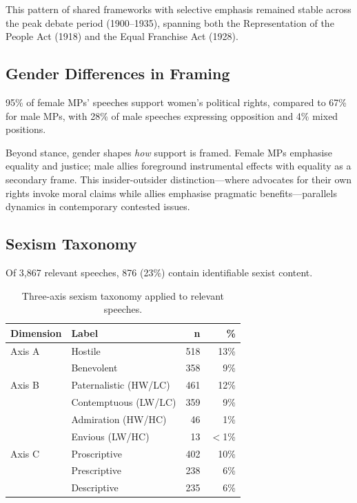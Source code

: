 \documentclass[11pt]{article}
\begin{document}

This pattern of shared frameworks with selective emphasis remained stable across the peak debate period (1900--1935), spanning both the Representation of the People Act (1918) and the Equal Franchise Act (1928).

\subsection{Gender Differences in Framing}

95\% of female MPs' speeches support women's political rights, compared to 67\% for male MPs, with 28\% of male speeches expressing opposition and 4\% mixed positions.

Beyond stance, gender shapes \emph{how} support is framed.
Female MPs emphasise equality and justice; male allies foreground instrumental effects with equality as a secondary frame.
This insider-outsider distinction---where advocates for their own rights invoke moral claims while allies emphasise pragmatic benefits---parallels dynamics in contemporary contested issues.

\subsection{Sexism Taxonomy}

Of 3,867 relevant speeches, 876 (23\%) contain identifiable sexist content.

\begin{table}[h]
\centering
\small
\begin{tabular}{llrr}
\toprule
\textbf{Dimension} & \textbf{Label} & \textbf{n} & \textbf{\%} \\
\midrule
Axis A & Hostile & 518 & 13\% \\
       & Benevolent & 358 & 9\% \\
\midrule
Axis B & Paternalistic (HW/LC) & 461 & 12\% \\
       & Contemptuous (LW/LC) & 359 & 9\% \\
       & Admiration (HW/HC) & 46 & 1\% \\
       & Envious (LW/HC) & 13 & $<$1\% \\
\midrule
Axis C & Proscriptive & 402 & 10\% \\
       & Prescriptive & 238 & 6\% \\
       & Descriptive & 235 & 6\% \\
\bottomrule
\end{tabular}
\caption{Three-axis sexism taxonomy applied to relevant speeches.}
\label{tab:sexism}
\end{table}
\end{document}
